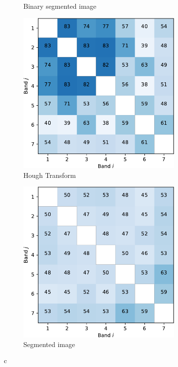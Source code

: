 \documentclass{article}
\begin{document}
\begin{figure}[h]
\begin{subfigure}[b]{0.49\linewidth}
    \caption{Binary segmented image} 
    \label{fig7:b} 
    \end{subfigure} 
  \begin{subfigure}[b]{0.49\linewidth}
    \centering
    \includegraphics[width=0.9\textwidth]{kmeans-crop.pdf} 
    \caption{Hough Transform} 
    \label{fig7:c} 
  \end{subfigure}%
  \begin{subfigure}[b]{0.49\linewidth}
    \centering
    \includegraphics[width=0.9\textwidth]{gmm-crop.pdf} 
    \caption{Segmented image} 
    \label{fig7:d} 
  \end{subfigure} 
  \caption{c}
  \label{fig7} 
\end{figure}
\end{document}
